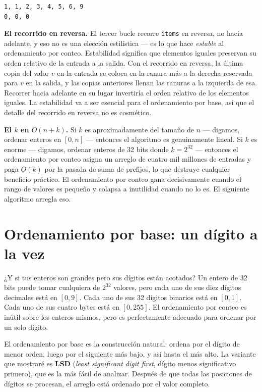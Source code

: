 \documentclass[11pt,a4paper]{article}
\begin{document}
\begin{verbatim}
1, 1, 2, 3, 4, 5, 6, 9
0, 0, 0

\end{verbatim}

\textbf{El recorrido en reversa.} El tercer bucle recorre \texttt{items} en reversa, no hacia adelante, y eso no es una elección estilística --- es lo que hace \emph{estable} al ordenamiento por conteo. Estabilidad significa que elementos iguales preservan su orden relativo de la entrada a la salida. Con el recorrido en reversa, la última copia del valor $v$ en la entrada se coloca en la ranura más a la derecha reservada para $v$ en la salida, y las copias anteriores llenan las ranuras a la izquierda de esa. Recorrer hacia adelante en su lugar invertiría el orden relativo de los elementos iguales. La estabilidad va a ser esencial para el ordenamiento por base, así que el detalle del recorrido en reversa no es cosmético.

\textbf{El $k$ en $O(n+k)$.} Si $k$ es aproximadamente del tamaño de $n$ --- digamos, ordenar enteros en $[0, n]$ --- entonces el algoritmo es genuinamente lineal. Si $k$ es enorme --- digamos, ordenar enteros de 32 bits donde $k = 2^{32}$ --- entonces el ordenamiento por conteo asigna un arreglo de cuatro mil millones de entradas y paga $O(k)$ por la pasada de suma de prefijos, lo que destruye cualquier beneficio práctico. El ordenamiento por conteo gana decisivamente cuando el rango de valores es pequeño y colapsa a inutilidad cuando no lo es. El siguiente algoritmo arregla eso.

\section{Ordenamiento por base: un dígito a la vez}

¿Y si tus enteros son grandes pero sus dígitos están acotados? Un entero de 32 bits puede tomar cualquiera de $2^{32}$ valores, pero cada uno de sus diez dígitos decimales está en $[0, 9]$. Cada uno de sus 32 dígitos binarios está en $[0, 1]$. Cada uno de sus cuatro bytes está en $[0, 255]$. El ordenamiento por conteo es inútil sobre los enteros mismos, pero es perfectamente adecuado para ordenar por un solo dígito.

El ordenamiento por base es la construcción natural: ordena por el dígito de menor orden, luego por el siguiente más bajo, y así hasta el más alto. La variante que mostraré es \textbf{LSD} (\emph{least significant digit first}, dígito menos significativo primero), que es la más fácil de analizar. Después de que todas las posiciones de dígitos se procesan, el arreglo está ordenado por el valor completo.
\end{document}
